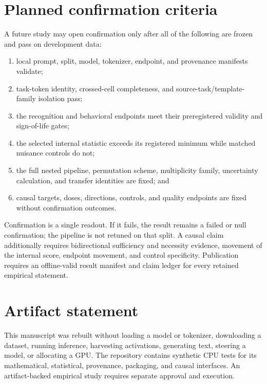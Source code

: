 \documentclass[10pt]{article}
\begin{document}
\section{Planned confirmation criteria}

A future study may open confirmation only after all of the following are frozen and pass on development data:
\begin{enumerate}[leftmargin=1.4em]
    \item local prompt, split, model, tokenizer, endpoint, and provenance manifests validate;
    \item task-token identity, crossed-cell completeness, and source-task/template-family isolation pass;
    \item the recognition and behavioral endpoints meet their preregistered validity and sign-of-life gates;
    \item the selected internal statistic exceeds its registered minimum while matched nuisance controls do not;
    \item the full nested pipeline, permutation scheme, multiplicity family, uncertainty calculation, and transfer identities are fixed; and
    \item causal targets, doses, directions, controls, and quality endpoints are fixed without confirmation outcomes.
\end{enumerate}

Confirmation is a single readout. If it fails, the result remains a failed or null confirmation; the pipeline is not retuned on that split. A causal claim additionally requires bidirectional sufficiency and necessity evidence, movement of the internal score, endpoint movement, and control specificity. Publication requires an offline-valid result manifest and claim ledger for every retained empirical statement.

\section*{Artifact statement}
This manuscript was rebuilt without loading a model or tokenizer, downloading a dataset, running inference, harvesting activations, generating text, steering a model, or allocating a GPU. The repository contains synthetic CPU tests for its mathematical, statistical, provenance, packaging, and causal interfaces. An artifact-backed empirical study requires separate approval and execution.



\end{document}
